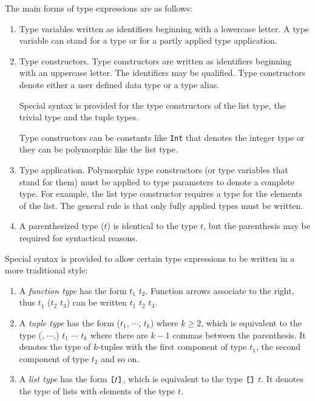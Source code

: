 The main forms of type expressions are as follows:

\begin{enumerate}
\item Type variables written as identifiers beginning with a lowercase letter.  A type variable can stand for a type or for a partly applied type application.

\item Type constructors. Type constructors are written as identifiers beginning with an uppercase letter. The identifiers may be qualified. Type constructors denote either a user defined data type or a type alias.

Special syntax is provided for the type constructors of the list type, the trivial type and the tuple types.

Type constructors can be constants like \texttt{Int} that denotes the integer type or they can be polymorphic like the list type.
\item Type application. Polymorphic type constructors (or type variables that stand for them) must be applied to type parameters to denote a complete type. For example, the list type constructor requires a type for the elements of the list. The general rule is that only fully applied types must be written. 
\item A parenthesized type ($t$) is identical to the type $t$, but the parenthesis may be required for syntactical reasons.
\end{enumerate}

Special syntax is provided to allow certain type expressions to be written in a more traditional style:

\begin{enumerate}
\item A \emph{function type} has the form $t_1$ \arrow{} $t_2$. Function arrows associate to the right, thus $t_1$ \arrow{} ($t_2$ \arrow{} $t_3$) can be written $t_1$ \arrow{} $t_2$ \arrow{} $t_3$.
\item A \emph{tuple type} has the form ($t_1$, $\cdots$, $t_k$) where $k\ge{}2$, which is equivalent to the type (, $\cdots$,) $t_1$ $\cdots$ $t_k$ where there are $k-1$ commas between the parenthesis.
It denotes the type of $k$-tuples with the first component of type $t_1$, the second component of type $t_2$ and so on.
\item A \emph{list type} has the form $\bracka{}t\brackz{}$, which is equivalent to the type $\bracka{}\brackz{}$ $t$. It denotes the type of lists with elements of the type $t$.
\end{enumerate}


